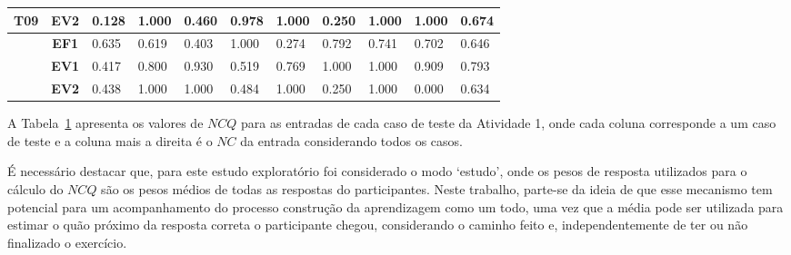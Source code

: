 \begin{table}[htbp]
\begin{tabular}{|cclllllllll|}
		\multicolumn{1}{|c|}{\multirow{-3}{*}{\cellcolor[HTML]{F2F2F2}\textbf{T09}}} & \multicolumn{1}{c|}{\textbf{EV2}} & \multicolumn{1}{l|}{0.128} & \multicolumn{1}{l|}{1.000} & \multicolumn{1}{l|}{0.460} & \multicolumn{1}{l|}{0.978} & \multicolumn{1}{l|}{1.000} & \multicolumn{1}{l|}{0.250} & \multicolumn{1}{l|}{1.000} & \multicolumn{1}{l|}{1.000} & 0.674 \\ \hline
		\rowcolor[HTML]{F2F2F2} 
		\multicolumn{1}{|c|}{\cellcolor[HTML]{F2F2F2}} & \multicolumn{1}{c|}{\cellcolor[HTML]{F2F2F2}\textbf{EF1}} & \multicolumn{1}{l|}{\cellcolor[HTML]{F2F2F2}0.635} & \multicolumn{1}{l|}{\cellcolor[HTML]{F2F2F2}0.619} & \multicolumn{1}{l|}{\cellcolor[HTML]{F2F2F2}0.403} & \multicolumn{1}{l|}{\cellcolor[HTML]{F2F2F2}1.000} & \multicolumn{1}{l|}{\cellcolor[HTML]{F2F2F2}0.274} & \multicolumn{1}{l|}{\cellcolor[HTML]{F2F2F2}0.792} & \multicolumn{1}{l|}{\cellcolor[HTML]{F2F2F2}0.741} & \multicolumn{1}{l|}{\cellcolor[HTML]{F2F2F2}0.702} & 0.646 \\ \cline{2-11} 
		\multicolumn{1}{|c|}{\cellcolor[HTML]{F2F2F2}} & \multicolumn{1}{c|}{\textbf{EV1}} & \multicolumn{1}{l|}{0.417} & \multicolumn{1}{l|}{0.800} & \multicolumn{1}{l|}{0.930} & \multicolumn{1}{l|}{0.519} & \multicolumn{1}{l|}{0.769} & \multicolumn{1}{l|}{1.000} & \multicolumn{1}{l|}{1.000} & \multicolumn{1}{l|}{0.909} & 0.793 \\ \cline{2-11} 
		\rowcolor[HTML]{F2F2F2} 
		\multicolumn{1}{|c|}{\multirow{-3}{*}{\cellcolor[HTML]{F2F2F2}\textbf{T10}}} & \multicolumn{1}{c|}{\cellcolor[HTML]{F2F2F2}\textbf{EV2}} & \multicolumn{1}{l|}{\cellcolor[HTML]{F2F2F2}0.438} & \multicolumn{1}{l|}{\cellcolor[HTML]{F2F2F2}1.000} & \multicolumn{1}{l|}{\cellcolor[HTML]{F2F2F2}1.000} & \multicolumn{1}{l|}{\cellcolor[HTML]{F2F2F2}0.484} & \multicolumn{1}{l|}{\cellcolor[HTML]{F2F2F2}1.000} & \multicolumn{1}{l|}{\cellcolor[HTML]{F2F2F2}0.250} & \multicolumn{1}{l|}{\cellcolor[HTML]{F2F2F2}1.000} & \multicolumn{1}{l|}{\cellcolor[HTML]{F2F2F2}0.000} & 0.634 \\ \hline
	\end{tabular}
	\label{tab:F3A1_NC_entradas_semagrupamento}
\end{table}

A Tabela~\ref{tab:F3A1_NC_entradas_semagrupamento} apresenta os valores de $NCQ$ para as entradas de cada caso de teste da Atividade 1, onde cada coluna corresponde a um caso de teste e a coluna mais a direita é o $NC$ da entrada considerando todos os casos. 

É necessário destacar que, para este estudo exploratório foi considerado o modo `estudo', onde os pesos de resposta utilizados para o cálculo do $NCQ$ são os pesos médios de todas as respostas do participantes. Neste trabalho, parte-se da ideia de que esse mecanismo tem potencial para um acompanhamento do processo construção da aprendizagem como um todo, uma vez que a média pode ser utilizada para estimar o quão próximo da resposta correta o participante chegou, considerando o caminho feito e, independentemente de ter ou não finalizado o exercício.

